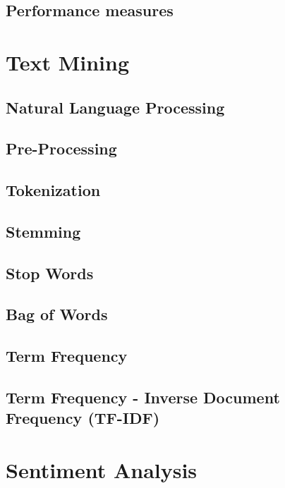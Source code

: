   \subsection{Performance measures}


\section{Text Mining}
  \subsection{Natural Language Processing}
  \subsection{Pre-Processing}
  \subsection{Tokenization}
  \subsection{Stemming}
  \subsection{Stop Words}
  \subsection{Bag of Words}
  \subsection{Term Frequency}
  \subsection{Term Frequency - Inverse Document Frequency (TF-IDF)}

\section{Sentiment Analysis}

